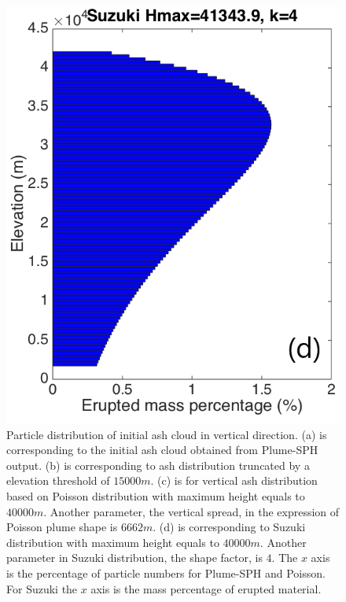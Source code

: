 \documentclass[utf8]{frontiersSCNS} %
\begin{document}
\begin{figure}[!htb]
\begin{minipage}{.247 \textwidth}
\end{minipage}%
\begin{minipage}{.247 \textwidth}
\centering
\includegraphics[width=0.99 \textwidth]{Figures/Suzuki-Hmax40k-ParticleDis-z}
\end{minipage}%
\caption{Particle distribution of initial ash cloud in vertical direction. (a) is corresponding to the initial ash cloud obtained from Plume-SPH output. (b) is corresponding to ash distribution truncated by a elevation threshold of $15000 m$. (c) is for vertical ash distribution based on Poisson distribution with maximum height equals to $40000 m$. Another parameter, the vertical spread, in the expression of Poisson plume shape is $6662 m$. (d) is corresponding to Suzuki distribution with maximum height equals to $40000 m$. Another parameter in Suzuki distribution, the shape factor, is $4$. The $x$ axis is the percentage of particle numbers for Plume-SPH and Poisson. For Suzuki the $x$ axis is the mass percentage of erupted material.}
\label{fig:Particle-distribution-Plume-SPH-vs-semiempirical}
\end{figure}
\end{document}
